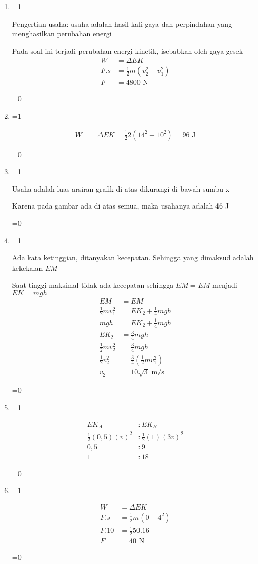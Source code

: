 \documentclass[10pt,a4paper]{article}
\def\tampilkunci{1}
\newcommand{\hide}[1]{\ifnum\tampilkunci=1
%
\begin{mybox}
 #1
\end{mybox}
%
\vspace{\baselineskip}\fi\ifnum\tampilkunci=0
%
%
\fi}
\begin{document}
\begin{multicols*}{2}
\begin{enumerate}
\item 

\hide{
Pengertian usaha: usaha adalah hasil kali gaya dan perpindahan yang menghasilkan perubahan energi

Pada soal ini terjadi perubahan energi kinetik, isebabkan oleh gaya gesek
\begin{align*}
W &= \Delta EK\\
F.s &= \frac{1}{2}m(v_2^2-v_1^2)\\
F&= 4800 \text{ N}
\end{align*}
}


\item 

\hide{
\begin{align*}
W &= \Delta EK = \frac{1}{2}2(14^2-10^2)=96\text{ J}
\end{align*}
}


\item 

\hide{
Usaha adalah luas arsiran grafik di atas dikurangi di bawah sumbu x

Karena pada gambar ada di atas semua, maka usahanya adalah 46 J
}

\item 

\hide{
Ada kata ketinggian, ditanyakan kecepatan. Sehingga yang dimaksud adalah kekekalan $EM$

Saat tinggi maksimal tidak ada kecepatan sehingga
$EM = EM$ menjadi $ EK= mgh$
\begin{align*}
EM & = EM\\
\frac{1}{2}mv_1^2 &=EK_2 + \frac{1}{4}mgh\\
mgh &= EK_2 + \frac{1}{4}mgh\\
EK_2&=\frac{3}{4}mgh\\
\frac{1}{2}mv_2^2&=\frac{3}{4}mgh\\
\frac{1}{2}v_2^2&=\frac{3}{4}\left ( \frac{1}{2}mv_1^2 \right)\\
v_2 &= 10\sqrt{3}\text{ m/s}
\end{align*}
}


\item 
\hide{
\begin{align*}
EK_A &: EK_B\\
\frac{1}{2}(0,5)(v)^2 &: \frac{1}{2}(1)(3v)^2\\
0,5 &: 9\\
1 &: 18
\end{align*}
}


\item 
\hide{
\begin{align*}
W &= \Delta EK\\
F.s &= \frac{1}{2}m(0-4^2)\\
F.10 &=\frac{1}{2}50.16\\
F &= 40 \text { N}
\end{align*}
}



\end{enumerate}
\end{multicols*}
\end{document}
